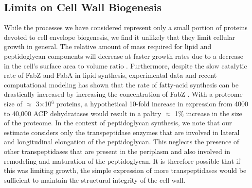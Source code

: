 \subsection{Limits on Cell Wall Biogenesis}
While the processes we have considered represent only a small portion of
proteins devoted to cell envelope biogenesis, we find it unlikely that they
limit cellular growth in general. The relative amount of mass required for
lipid and peptidoglycan components will decrease at faster growth rates due to a
decrease in the cell's surface area to volume ratio \citep{ojkic2019}.
Furthermore, despite the slow catalytic rate of FabZ and FabA in lipid
synthesis, experimental data and recent computational modeling has shown that
the rate of fatty-acid synthesis can be drastically increased by increasing
the concentration of FabZ \citep{yu2011, ruppe2018}. With a proteome size of
$\approx$ 3$\times$10$^6$ proteins, a hypothetical 10-fold increase in
expression from 4000 to 40,000 ACP dehydratases would result in a paltry
$\approx$ 1\% increase in the size of the proteome. In the context of
peptidoglycan synthesis, we note that our estimate considers only the
transpeptidase enzymes that are involved in lateral and longitudinal elongation
of the peptidoglycan. This neglects the presence of other transpeptidases
that are present in the periplasm and also involved in remodeling and
maturation of the peptidoglycan. It is therefore possible that if this was
limiting growth, the simple expression of more
transpeptidases would be sufficient to maintain the structural integrity of the
cell wall.

